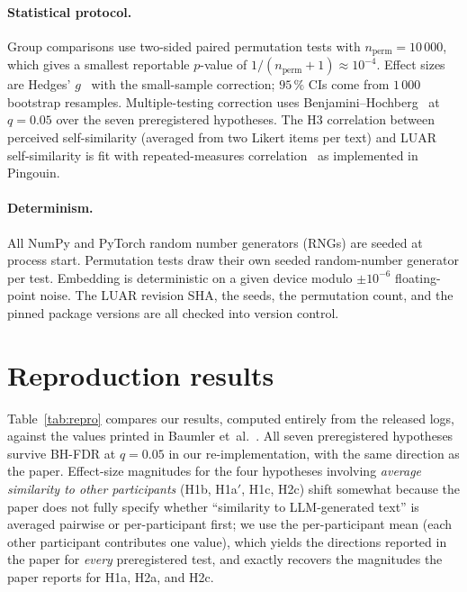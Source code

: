\documentclass[runningheads]{llncs}
\begin{document}
\paragraph{Statistical protocol.}
Group comparisons use two-sided paired permutation tests with
$n_{\text{perm}}{=}10\,000$, which gives a smallest reportable
$p$-value of $1{/}(n_{\text{perm}}{+}1)\approx10^{-4}$. Effect sizes
are Hedges' $g$~\cite{hedges1981} with the small-sample correction;
$95\,\%$ CIs come from $1\,000$ bootstrap resamples. Multiple-testing
correction uses Benjamini--Hochberg~\cite{benjamini1995fdr} at
$q{=}0.05$ over the seven preregistered hypotheses. The H3
correlation between perceived self-similarity (averaged from two
Likert items per text) and LUAR self-similarity is fit with
repeated-measures correlation~\cite{bakdash2017rmcorr} as
implemented in Pingouin.

\paragraph{Determinism.}
All NumPy and PyTorch random number generators (RNGs) are seeded at
process start. Permutation tests draw their own seeded
random-number generator per test. Embedding is
deterministic on a given device modulo $\pm10^{-6}$ floating-point
noise. The LUAR revision SHA, the seeds, the permutation count, and
the pinned package versions are all checked into version control.

\section{Reproduction results}\label{sec:repro-results}

Table~\ref{tab:repro} compares our results, computed entirely from
the released logs, against the values printed in
Baumler et~al.~\cite{baumler2026personalstyle}. All seven preregistered
hypotheses survive BH-FDR at $q{=}0.05$ in our re-implementation,
with the same direction as the paper. Effect-size
magnitudes for the four hypotheses involving \emph{average similarity
to other participants} (H1b, H1a$'$, H1c, H2c) shift somewhat because
the paper does not fully specify whether ``similarity to
LLM-generated text'' is averaged pairwise or per-participant first;
we use the per-participant mean (each other participant contributes
one value), which yields the directions reported in the paper for
\emph{every} preregistered test, and exactly recovers the magnitudes
the paper reports for H1a, H2a, and H2c.
\end{document}
